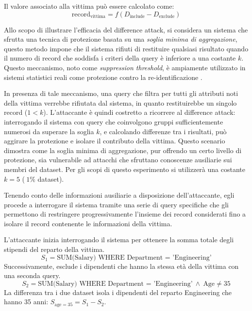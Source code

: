 \noindent
Il valore associato alla vittima può essere calcolato come:
\begin{equation}
    \text{record}_{\text{vittima}} = f(D_{\text{include}} - D_{\text{exclude}})
    \label{eq:differencing_attack}
\end{equation}

Allo scopo di illustrare l'efficacia del difference attack, si considera un sistema che sfrutta una tecnica di protezione basata su una \textit{soglia minima di aggregazione}, questo metodo impone che il sistema rifiuti di restituire qualsiasi risultato quando il numero di record che soddisfa i criteri della query è inferiore a una costante $k$. Questo meccanismo, noto come \textit{suppression threshold}, è ampiamente utilizzato in sistemi statistici reali come protezione contro la re-identificazione \cite{kThreshold}.

In presenza di tale meccanismo, una query che filtra per tutti gli attributi noti della vittima verrebbe rifiutata dal sistema, in quanto restituirebbe un singolo record ($1 < k$). L'attaccante è quindi costretto a ricorrere al difference attack: interrogando il sistema con query che coinvolgono gruppi sufficientemente numerosi da superare la soglia $k$, e calcolando differenze tra i risultati, può aggirare la protezione e isolare il contributo della vittima. Questo scenario dimostra come la soglia minima di aggregazione, pur offrendo un certo livello di protezione, sia vulnerabile ad attacchi che sfruttano conoscenze ausiliarie sui membri del dataset. Per gli scopi di questo esperimento si utilizzerà una costante $k = 5$ ($~ 1\%$ dataset).

Tenendo conto delle informazioni ausiliarie a disposizione dell'attaccante, egli procede a interrogare il sistema tramite una serie di query specifiche che gli permettono di restringere progressivamente l'insieme dei record considerati fino a isolare il record contenente le informazioni della vittima.

L'attaccante inizia interrogando il sistema per ottenere la somma totale degli stipendi del reparto della vittima.
\begin{equation}
    S_1 = \text{SUM(Salary) WHERE Department = 'Engineering'}
\end{equation}
Successivamente, esclude i dipendenti che hanno la stessa età della vittima con una seconda query.
\begin{equation}
    S_2 = \text{SUM(Salary) WHERE Department = 'Engineering'} \ \land \ \text{Age} \neq 35
\end{equation}
La differenza tra i due dataset isola i dipendenti del reparto Engineering che hanno 35 anni: $S_{\text{age}=35} = S_1 - S_2$.

